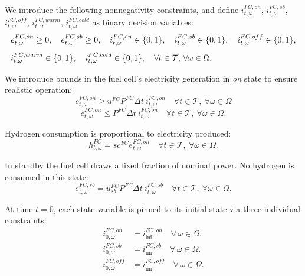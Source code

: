 \documentclass{article}
\begin{document}
\medskip

We introduce the following nonnegativity constraints, and define $i^{FC,on}_{t, \omega}$, $i^{FC,sb}_{t, \omega}$, $i^{FC,off}_{t, \omega}$, $i^{FC,warm}_{t, \omega}$, $i^{FC,cold}_{t, \omega}$ as binary decision variables:
\begin{align}
    & e^{FC,on}_{t,\omega} \ge 0,\quad
      e^{FC,sb}_{t,\omega} \ge 0,\quad
      i^{FC,on}_{t,\omega}\in\{0,1\},\quad
      i^{FC,sb}_{t,\omega}\in\{0,1\},\quad
      i^{FC,off}_{t,\omega}\in\{0,1\},\notag \\[1ex]
    & i^{FC,warm}_{t,\omega}\in\{0,1\},\quad
      i^{FC,cold}_{t,\omega}\in\{0,1\},
      \quad \forall t\in\mathcal{T},\,\forall\omega\in\Omega.
    \label{EQ:FC_nonnegativity}
\end{align}


We introduce bounds in the fuel cell's electricity generation in \emph{on} state to ensure realistic operation:
\begin{equation} \label{EQ:FC_min_power}
    e^{FC,on}_{t, \omega} \geq \underline{u}^{FC}  P^{FC} \Delta t\ i^{FC,on}_{t, \omega} \quad \forall t \in \mathcal{T}, \ \forall \omega \in \Omega
\end{equation}
\begin{equation} \label{EQ:FC_max_power}
    e^{FC,on}_{t, \omega} \leq P^{FC} \Delta t\  i^{FC,on}_{t, \omega} \quad \forall t \in \mathcal{T}, \ \forall \omega \in \Omega.
\end{equation}

\medskip

Hydrogen consumption is proportional to electricity produced:
\begin{equation} \label{EQ:FC_conversion}
    h^{FC}_{t, \omega} = sc^{FC}  e^{FC,on}_{t, \omega} \quad \forall t \in \mathcal{T}, \ \forall \omega \in \Omega.
\end{equation}

\medskip

In standby the fuel cell draws a fixed fraction of nominal power. No hydrogen is consumed in this state:
\begin{equation} \label{EQ:FC_SB_energy_balance}
    e^{FC,sb}_{t,\omega} = u_{sb}^{FC}  P^{FC} \Delta t\  i^{FC,sb}_{t,\omega} \quad \forall t \in \mathcal{T}, \ \forall \omega \in \Omega.
\end{equation}

At time \(t=0\), each state variable is pinned to its initial state via three individual constraints:
\begin{align}
  \label{EQ:FC_on_ini}
  i^{FC,on}_{0,\omega}
  &= i^{FC,on}_{\mathrm{ini}}
  \quad \forall\,\omega\in\Omega.\\
  \label{EQ:FC_sb_ini}
  i^{FC,sb}_{0,\omega}
  &= i^{FC,sb}_{\mathrm{ini}}
  \quad \forall\,\omega\in\Omega.\\
  \label{EQ:FC_off_ini}
  i^{FC,off}_{0,\omega}
  &= i^{FC,off}_{\mathrm{ini}}
  \quad \forall\,\omega\in\Omega.
\end{align}
\end{document}
